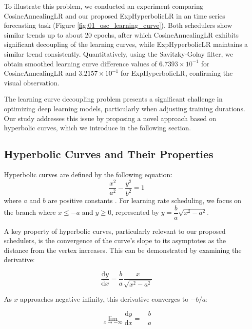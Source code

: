 \documentclass{article}
\theoremstyle{plain}
\theoremstyle{definition}
\theoremstyle{remark}
\begin{document}
To illustrate this problem, we conducted an experiment comparing CosineAnnealingLR and our proposed ExpHyperbolicLR in an time series forecasting task (Figure \ref{fig:01_osc_learning_curve}).
Both schedulers show similar trends up to about 20 epochs, after which CosineAnnealingLR exhibits significant decoupling of the learning curves, while ExpHyperbolicLR maintains a similar trend consistently.
Quantitatively, using the Savitzky-Golay filter, we obtain smoothed learning curve difference values of $6.7393 \times 10^{-1}$ for CosineAnnealingLR and $3.2157 \times 10^{-1}$ for ExpHyperbolicLR, confirming the visual observation.

The learning curve decoupling problem presents a significant challenge in optimizing deep learning models, particularly when adjusting training durations. Our study addresses this issue by proposing a novel approach based on hyperbolic curves, which we introduce in the following section.

\subsection{Hyperbolic Curves and Their Properties}
\label{subsec:hyperbolic_curves}

Hyperbolic curves are defined by the following equation:
\begin{equation}
\dfrac{x^2}{a^2} - \dfrac{y^2}{b^2} = 1
\end{equation}
where $a$ and $b$ are positive constants \cite{protter1970college}.
For learning rate scheduling, we focus on the branch where $x \leq -a$ and $y \geq 0$, represented by $y = \dfrac{b}{a} \sqrt{x^2 - a^2}$. 

A key property of hyperbolic curves, particularly relevant to our proposed schedulers, is the convergence of the curve's slope to its asymptotes as the distance from the vertex increases.
This can be demonstrated by examining the derivative:

\begin{equation}
   \frac{\mathrm{d}y}{\mathrm{d}x} = \frac{b}{a} \frac{x}{\sqrt{x^2 - a^2}}
\end{equation}

As $x$ approaches negative infinity, this derivative converges to $-b/a$:

\begin{equation}
   \lim_{x \rightarrow -\infty} \frac{\mathrm{d}y}{\mathrm{d}x} = -\frac{b}{a}
\end{equation}
\end{document}
